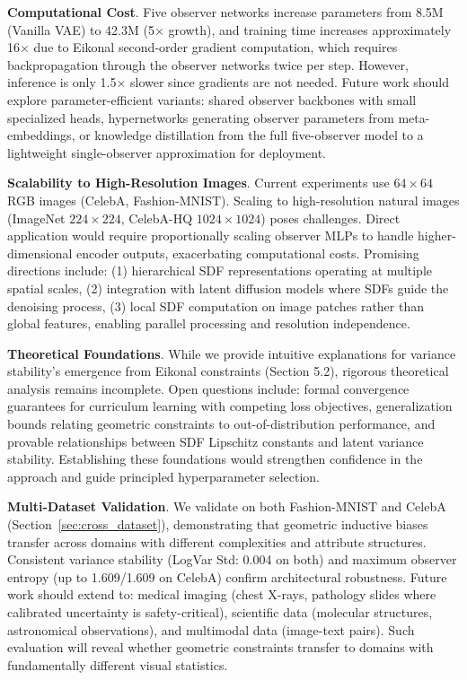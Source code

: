\documentclass[10pt,twocolumn,letterpaper]{article}
\begin{document}
\textbf{Computational Cost}. Five observer networks increase parameters from 8.5M (Vanilla VAE) to 42.3M (5$\times$ growth), and training time increases approximately 16$\times$ due to Eikonal second-order gradient computation, which requires backpropagation through the observer networks twice per step. However, inference is only 1.5$\times$ slower since gradients are not needed. Future work should explore parameter-efficient variants: shared observer backbones with small specialized heads, hypernetworks generating observer parameters from meta-embeddings, or knowledge distillation from the full five-observer model to a lightweight single-observer approximation for deployment.

\textbf{Scalability to High-Resolution Images}. Current experiments use $64 \times 64$ RGB images (CelebA, Fashion-MNIST). Scaling to high-resolution natural images (ImageNet $224 \times 224$, CelebA-HQ $1024 \times 1024$) poses challenges. Direct application would require proportionally scaling observer MLPs to handle higher-dimensional encoder outputs, exacerbating computational costs. Promising directions include: (1) hierarchical SDF representations operating at multiple spatial scales, (2) integration with latent diffusion models where SDFs guide the denoising process, (3) local SDF computation on image patches rather than global features, enabling parallel processing and resolution independence.

\textbf{Theoretical Foundations}. While we provide intuitive explanations for variance stability's emergence from Eikonal constraints (Section 5.2), rigorous theoretical analysis remains incomplete. Open questions include: formal convergence guarantees for curriculum learning with competing loss objectives, generalization bounds relating geometric constraints to out-of-distribution performance, and provable relationships between SDF Lipschitz constants and latent variance stability. Establishing these foundations would strengthen confidence in the approach and guide principled hyperparameter selection.

\textbf{Multi-Dataset Validation}. We validate on both Fashion-MNIST and CelebA (Section~\ref{sec:cross_dataset}), demonstrating that geometric inductive biases transfer across domains with different complexities and attribute structures. Consistent variance stability (LogVar Std: 0.004 on both) and maximum observer entropy (up to 1.609/1.609 on CelebA) confirm architectural robustness. Future work should extend to: medical imaging (chest X-rays, pathology slides where calibrated uncertainty is safety-critical), scientific data (molecular structures, astronomical observations), and multimodal data (image-text pairs). Such evaluation will reveal whether geometric constraints transfer to domains with fundamentally different visual statistics.
\end{document}
